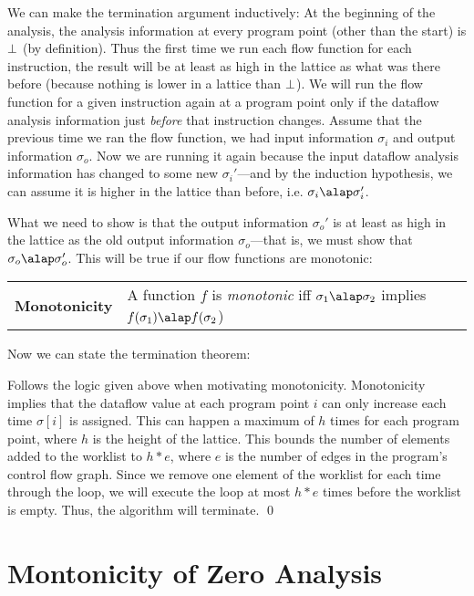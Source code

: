 \documentclass[11pt]{article}
\newcommand{\definition}[2]
  {\bigskip
   \begin{tabular}{p{1.5in}p{4.0in}}
        \textbf{#1} & #2 \\
        \end{tabular}
  }
\begin{document}
We can make the termination argument inductively:  At the beginning of the analysis, the analysis information at every program point (other than the start) is $\bot$ (by definition).  Thus the first time we run each flow function for each instruction, the result will be at least as high in the lattice as what was there before (because nothing is lower in a lattice than $\bot$).  We will run the flow function for a given instruction again at a program point only if the dataflow analysis information just \emph{before} that instruction changes.  Assume that the previous time we ran the flow function, we had input information $\sigma_i$ and output information $\sigma_o$.  Now we are running it again because the input dataflow analysis information has changed to some new $\sigma_i'$---and by the induction hypothesis, we can assume it is higher in the lattice than before, i.e. $\sigma_i \alap \sigma_i'$.  

What we need to show is that the output information $\sigma_o'$ is at least as high in the lattice as the old output information $\sigma_o$---that is, we must show that $\sigma_o \alap \sigma_o'$.  This will be true if our flow functions are monotonic:

\definition{Monotonicity}{A function $f$ is \textit{monotonic} iff $\sigma_1 \alap \sigma_2$ implies $f(\sigma_1) \alap f(\sigma_2$)}



\noindent Now we can state the termination theorem:


\proof Follows the logic given above when motivating monotonicity.  Monotonicity implies that the dataflow value at each program point $i$ can only increase each time $\sigma[i]$ is assigned.  This can happen a maximum of $h$ times for each program point, where $h$ is the height of the lattice.  This bounds the number of elements added to the worklist to $h * e$, where $e$ is the number of edges in the program's control flow graph.  Since we remove one element of the worklist for each time through the loop, we will execute the loop at most $h * e$ times before the worklist is empty.  Thus, the algorithm will terminate.
\qed

\section{Montonicity of Zero Analysis}
\end{document}
